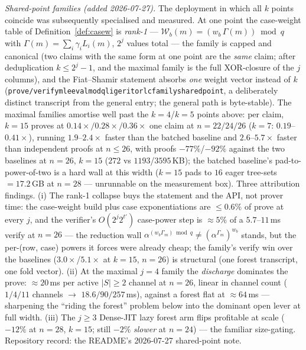 \documentclass[11pt]{article}
\newcommand{\Wc}{\mathcal{W}}          %
\DeclareRobustCommand{\code}[1]{{\def\_{\textunderscore\allowbreak}\texttt{#1}}}
\theoremstyle{plain}
\theoremstyle{definition}
\theoremstyle{remark}
\begin{document}
\emph{Shared-point families (added 2026-07-27).} The deployment in which
all $k$ points coincide was subsequently specialised and measured. At one
point the case-weight table of Definition~\ref{def:casew} is
\emph{rank-1} --- $\Wc_b(m) = (w_b\,\Gamma(m))\bmod q$ with
$\Gamma(m)=\sum_i\gamma_i L_i(m)$, $2^{j}$ values total --- the family is
capped and canonical (two claims with the same form at one point are the
\emph{same} claim; after deduplication $k\le 2^{j}-1$, and the maximal
family is the full XOR-closure of the $j$ columns), and the Fiat--Shamir
statement absorbs \emph{one} weight vector instead of $k$
(\code{prove/verify\_mle\_eval\_mod\_q\_ligerito\_rlc\_family\_shared\_point},
a deliberately distinct transcript from the general entry; the general
path is byte-stable). The maximal families amortise well past the
$k=4$/$k=5$ points above: per claim, $k=15$ proves at
$0.14\times/0.28\times/0.36\times$ one claim at $n=22/24/26$ ($k=7$:
$0.19$--$0.41\times$), running $1.9$--$2.4\times$ faster than the batched
baseline and $2.6$--$5.7\times$ faster than independent proofs at
$n\le26$, with proofs $-77\%$/$-92\%$ against the two baselines at
$n{=}26$, $k{=}15$ ($272$ vs $1193$/$3595$\,KB); the batched baseline's
pad-to-power-of-two is a hard wall at this width ($k{=}15$ pads to $16$
eager tree-sets $= 17.2$\,GB at $n{=}28$ --- unrunnable on the
measurement box). Three attribution findings. (i) The rank-1 collapse
buys the statement and the API, not prover time: the case-weight build
plus case exponentiations are $\le 0.6\%$ of prove at every $j$, and the
verifier's $O(2^{j}2^{t'})$ case-power step is ${\approx}5\%$ of a
$5.7$--$11$\,ms verify at $n{=}26$ --- the reduction wall
$\alpha^{(w_b\Gamma_m)\bmod q}\ne(\alpha^{\Gamma_m})^{w_b}$ stands, but
the per-(row, case) powers it forces were already cheap; the family's
verify win over the baselines ($3.0\times$/$5.1\times$ at $k{=}15$,
$n{=}26$) is structural (one forest transcript, one fold vector). (ii)
At the maximal $j{=}4$ family the \emph{discharge} dominates the prove:
${\approx}20$\,ms per active $|S|\ge2$ channel at $n{=}26$, linear in
channel count ($1/4/11$ channels $\to$ $18.6/90/257$\,ms), against a
forest flat at ${\approx}64$\,ms --- sharpening the ``riding the
forest'' problem below into the dominant open lever at full width. (iii)
The $j\ge3$ Dense-JIT lazy forest arm flips profitable at scale
($-12\%$ at $n{=}28$, $k{=}15$; still $-2\%$ \emph{slower} at $n{=}24$)
--- the familiar size-gating. Repository record: the README's
2026-07-27 shared-point note.
\end{document}
